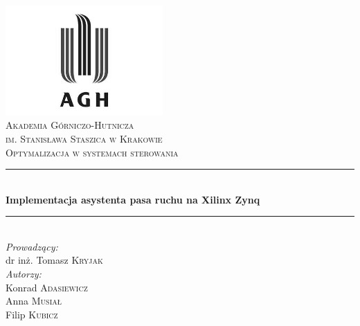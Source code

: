 \begin{titlepage}

\newcommand{\HRule}{\rule{\linewidth}{0.5mm}}

\center
 

\includegraphics[width=6cm]{../res/img/logo.png}\\[1cm]
 
 

\textsc{\LARGE Akademia Górniczo-Hutnicza \\[0.2cm]
im. Stanisława Staszica w Krakowie}\\[1.5cm]

\textsc{\Large Optymalizacja w systemach sterowania}\\[0.5cm]


\HRule \\[0.5cm]
{ \huge \bfseries Implementacja asystenta pasa ruchu na Xilinx Zynq}\\[0.3cm]
\HRule \\[1.5cm]

\flushright
\Large \emph{Prowadzący:}\\
dr inż. Tomasz \textsc{Kryjak}\\[1cm]
\Large \emph{Autorzy:}\\
Konrad \textsc{Adasiewicz}\\[0.1cm]        %
Anna \textsc{Musiał}\\[0.1cm]  %
Filip \textsc{Kubicz}\\[3cm]



\end{titlepage}

